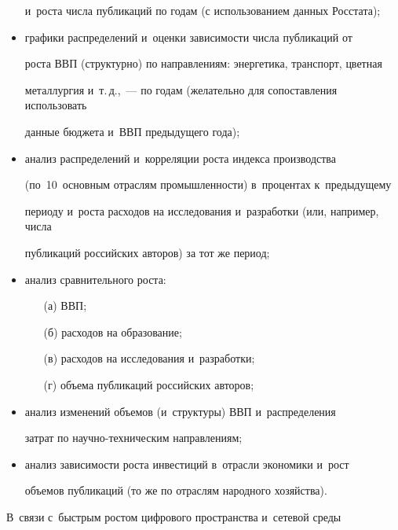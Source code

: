\begin{multicols}{2}
\begin{itemize}
и~роста числа пуб\-ли\-ка\-ций по годам (с использованием данных Росстата); 

    \item  графики распределений и~оценки зависимости числа публикаций от 

роста ВВП (структурно) по на\-прав\-ле\-ни\-ям: энергетика, транспорт, цветная 

металлургия и~т.\,д.,~--- по годам (желательно для сопоставления использовать 

данные бюджета и~ВВП предыдущего года);

    \item  анализ распределений и~корреляции роста индекса производства 

(по~10~основным отраслям про\-мыш\-лен\-ности) в~процентах к~предыдущему 

периоду и~роста расходов на исследования и~разработки (или, например, числа 

пуб\-ли\-ка\-ций российских авторов) за тот же период;

    \item анализ сравнительного роста: 

    \begin{itemize}

    \item[(а)] ВВП; 

    \item[(б)] расходов на образование;

        \item[(в)] расходов на исследования и~разработки; 

    \item[(г)] объема пуб\-ли\-ка\-ций российских авторов;

    \end{itemize}

    \item  анализ изменений объемов (и~структуры) ВВП и~распределения 

затрат по на\-уч\-но-тех\-ни\-че\-ским на\-прав\-ле\-ниям;

    \item  анализ зависимости роста инвестиций в~от\-расли экономики и~рост 

объемов публикаций (то же по отраслям народного хозяйства).

    \end{itemize}

    

    В~связи с~быстрым ростом цифрового пространства и~сетевой среды 


\end{multicols}
